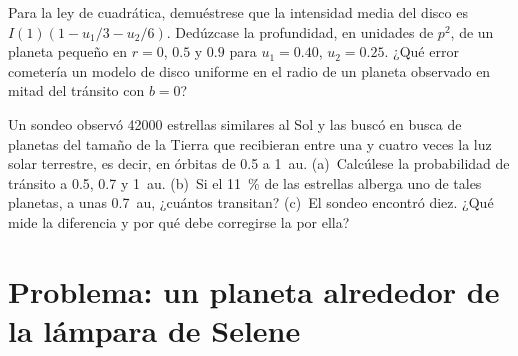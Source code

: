 \begin{exercise}[$\star\star\star$]\label{exo:b3:exoplanets:11}
Para la ley de  cuadrática, demuéstrese que la intensidad
media del disco es $I(1)(1 - u_1/3 - u_2/6)$. Dedúzcase la profundidad, en unidades
de $p^2$, de un planeta pequeño en $r = 0$, $0.5$ y $0.9$ para $u_1 = 0.40$,
$u_2 = 0.25$. ¿Qué error cometería un modelo de disco uniforme en el radio de un
planeta observado en mitad del tránsito con $b = 0$?
\end{exercise}

\begin{exercise}[$\star\star\star$]\label{exo:b3:exoplanets:12}
Un sondeo observó \num{42000} estrellas similares al Sol y las buscó en busca de
planetas del tamaño de la Tierra que recibieran entre una y cuatro veces la luz
solar terrestre, es decir, en órbitas de 0.5 a \qty{1}{au}. (a)~Calcúlese la
probabilidad de tránsito a 0.5, 0.7 y \qty{1}{au}. (b)~Si el \qty{11}{\percent} de las
estrellas alberga uno de tales planetas, a unas \qty{0.7}{au}, ¿cuántos transitan?
(c)~El sondeo encontró diez. ¿Qué mide la diferencia y por qué debe corregirse la
 por ella?
\end{exercise}

\section{Problema: un planeta alrededor de la lámpara de Selene}

